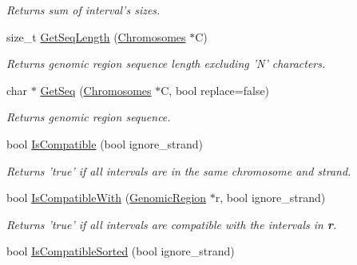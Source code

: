 \begin{CompactItemize}
\begin{CompactList}\small\item\em Returns sum of interval's sizes. \item\end{CompactList}\item 
\hypertarget{classGenomicRegion_719143f1affa44c38493b2cd43448d3b}{
size\_\-t \hyperlink{classGenomicRegion_719143f1affa44c38493b2cd43448d3b}{GetSeqLength} (\hyperlink{classChromosomes}{Chromosomes} $\ast$C)}
\label{classGenomicRegion_719143f1affa44c38493b2cd43448d3b}

\begin{CompactList}\small\item\em Returns genomic region sequence length excluding 'N' characters. \item\end{CompactList}\item 
\hypertarget{classGenomicRegion_fcf7c053989b87f425f084d1f2c078f5}{
char $\ast$ \hyperlink{classGenomicRegion_fcf7c053989b87f425f084d1f2c078f5}{GetSeq} (\hyperlink{classChromosomes}{Chromosomes} $\ast$C, bool replace=false)}
\label{classGenomicRegion_fcf7c053989b87f425f084d1f2c078f5}

\begin{CompactList}\small\item\em Returns genomic region sequence. \item\end{CompactList}\item 
\hypertarget{classGenomicRegion_58c2fe162c1e9bbbd7c90d5abd011ff0}{
bool \hyperlink{classGenomicRegion_58c2fe162c1e9bbbd7c90d5abd011ff0}{IsCompatible} (bool ignore\_\-strand)}
\label{classGenomicRegion_58c2fe162c1e9bbbd7c90d5abd011ff0}

\begin{CompactList}\small\item\em Returns 'true' if all intervals are in the same chromosome and strand. \item\end{CompactList}\item 
\hypertarget{classGenomicRegion_2ebd984a2632314a39a6e9ba2c497105}{
bool \hyperlink{classGenomicRegion_2ebd984a2632314a39a6e9ba2c497105}{IsCompatibleWith} (\hyperlink{classGenomicRegion}{GenomicRegion} $\ast$r, bool ignore\_\-strand)}
\label{classGenomicRegion_2ebd984a2632314a39a6e9ba2c497105}

\begin{CompactList}\small\item\em Returns 'true' if all intervals are compatible with the intervals in {\bf r}. \item\end{CompactList}\item 
\hypertarget{classGenomicRegion_2e0765dfbe651ad583faa8c8a77e047f}{
bool \hyperlink{classGenomicRegion_2e0765dfbe651ad583faa8c8a77e047f}{IsCompatibleSorted} (bool ignore\_\-strand)}
\label{classGenomicRegion_2e0765dfbe651ad583faa8c8a77e047f}


\end{CompactItemize}
